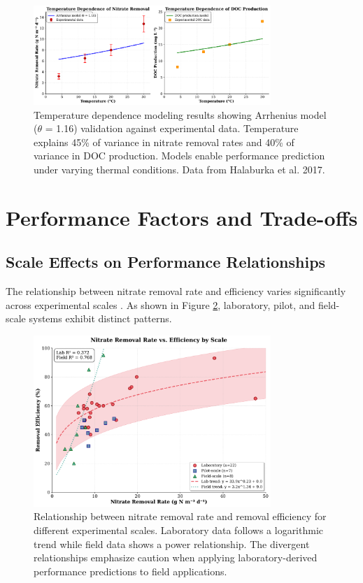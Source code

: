 \documentclass[12pt,a4paper]{article}
\begin{document}
\begin{figure}[ht]
\centering
\includegraphics[width=0.8\textwidth]{fig10_temperature_modeling_scientific}
\caption{Temperature dependence modeling results showing Arrhenius model ($\theta$ = 1.16) validation against experimental data. Temperature explains 45\% of variance in nitrate removal rates and 40\% of variance in DOC production. Models enable performance prediction under varying thermal conditions. Data from Halaburka et al. 2017.}
\label{fig:temperature_modeling}
\end{figure}

\section{Performance Factors and Trade-offs}

\subsection{Scale Effects on Performance Relationships}

The relationship between nitrate removal rate and efficiency varies significantly across experimental scales \citep{RN312, RN310}. As shown in Figure \ref{fig:rate_vs_efficiency}, laboratory, pilot, and field-scale systems exhibit distinct patterns.

\begin{figure}[ht]
\centering
\includegraphics[width=0.8\textwidth]{fig2_rate_efficiency_scientific}
\caption{Relationship between nitrate removal rate and removal efficiency for different experimental scales. Laboratory data follows a logarithmic trend while field data shows a power relationship. The divergent relationships emphasize caution when applying laboratory-derived performance predictions to field applications.}
\label{fig:rate_vs_efficiency}
\end{figure}
\end{document}
